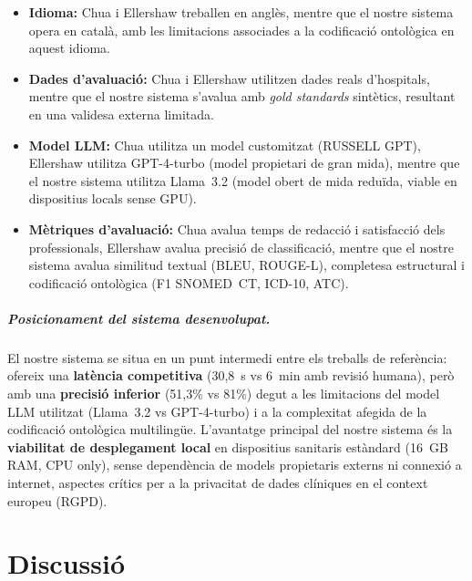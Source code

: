\documentclass[CAT]{TFUOC}%
\begin{document}
\begin{itemize}
    \item \textbf{Idioma:} Chua i Ellershaw treballen en anglès, mentre que el nostre sistema opera en català, amb les limitacions associades a la codificació ontològica en aquest idioma.
    
    \item \textbf{Dades d'avaluació:} Chua i Ellershaw utilitzen dades reals d'hospitals, mentre que el nostre sistema s'avalua amb \textit{gold standards} sintètics, resultant en una validesa externa limitada.
    
    \item \textbf{Model LLM:} Chua utilitza un model customitzat (RUSSELL GPT), Ellershaw utilitza GPT-4-turbo (model propietari de gran mida), mentre que el nostre sistema utilitza Llama~3.2 (model obert de mida reduïda, viable en dispositius locals sense GPU).
    
    \item \textbf{Mètriques d'avaluació:} Chua avalua temps de redacció i satisfacció dels professionals, Ellershaw avalua precisió de classificació, mentre que el nostre sistema avalua similitud textual (BLEU, ROUGE-L), completesa estructural i codificació ontològica (F1 SNOMED~CT, ICD-10, ATC).
\end{itemize}

\paragraph{Posicionament del sistema desenvolupat.}
El nostre sistema se situa en un punt intermedi entre els treballs de referència: ofereix una \textbf{latència competitiva} (30,8~s vs 6~min amb revisió humana), però amb una \textbf{precisió inferior} (51,3\% vs 81\%) degut a les limitacions del model LLM utilitzat (Llama~3.2 vs GPT-4-turbo) i a la complexitat afegida de la codificació ontològica multilingüe. L'avantatge principal del nostre sistema és la \textbf{viabilitat de desplegament local} en dispositius sanitaris estàndard (16~GB RAM, CPU only), sense dependència de models propietaris externs ni connexió a internet, aspectes crítics per a la privacitat de dades clíniques en el context europeu (RGPD).


\chapter{Discussió}
\end{document}
